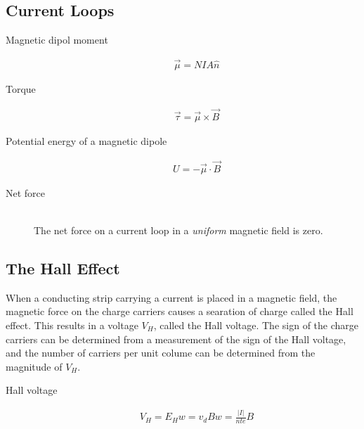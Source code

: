 \documentclass[../main.tex]{subfiles}
\begin{document}
\subsection{Current Loops}
\label{sub:current_loops}

\begin{description}
  \item[Magnetic dipol moment]
    \begin{align}
      \vec{\mu} = NIA\hat{n}
    \end{align}
  \item[Torque]
    \begin{align}
      \vec{\tau} = \vec{\mu}\times\vec{B}
    \end{align}
  \item[Potential energy of a magnetic dipole]
    \begin{align}
      U = -\vec{\mu}\cdot\vec{B}
    \end{align}
  \item[Net force] \hfill \\
    The net force on a current loop in a \textit{uniform} magnetic field is
    zero.
\end{description}

\subsection{The Hall Effect}
\label{sub:the_hall_effect}

When a conducting strip carrying a current is placed in a magnetic field, the
magnetic force on the charge carriers causes a searation of charge called the
Hall effect. This results in a voltage $V_H$, called the Hall voltage. The sign
of the charge carriers can be determined from a measurement of the sign of the
Hall voltage, and the number of carriers per unit colume can be determined from
the magnitude of $V_H$.

\begin{description}
  \item[Hall voltage]
    \begin{align}
      V_H = E_Hw = v_dBw = \frac{|I|}{nte}B
    \end{align}
\end{description}
\end{document}
